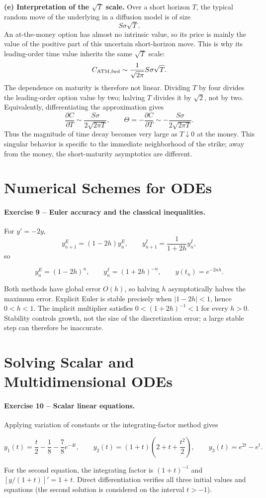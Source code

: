 \documentclass[10pt]{article}
\newcommand{\solution}[1]{\begin{tcolorbox}[breakable,colback=ResultBlue!3,colframe=ResultBlue,
  boxrule=0.8pt,arc=1mm,title=\textbf{Result},fonttitle=\bfseries]#1\end{tcolorbox}}
\begin{document}
\textbf{(e) Interpretation of the $\sqrt T$ scale.} Over a short horizon $T$,
the typical random move of the underlying in a diffusion model is of size
\[
S\sigma\sqrt T.
\]
An at-the-money option has almost no intrinsic value, so its price is mainly
the value of the positive part of this uncertain short-horizon move. This is
why its leading-order time value inherits the same $\sqrt T$ scale:
\[
C_{\rm ATM,fwd}\sim
\frac{1}{\sqrt{2\pi}}S\sigma\sqrt T.
\]
The dependence on maturity is therefore not linear. Dividing $T$ by four
divides the leading-order option value by two; halving $T$ divides it by
$\sqrt2$, not by two. Equivalently, differentiating the approximation gives
\[
\frac{\partial C}{\partial T}
\sim\frac{S\sigma}{2\sqrt{2\pi T}},
\qquad
\Theta=-\frac{\partial C}{\partial T}
\sim-\frac{S\sigma}{2\sqrt{2\pi T}}.
\]
Thus the magnitude of time decay becomes very large as $T\downarrow0$ at the
money. This singular behavior is specific to the immediate neighborhood of
the strike; away from the money, the short-maturity asymptotics are different.

\section{Numerical Schemes for ODEs}

\paragraph{Exercise 9 -- Euler accuracy and the classical inequalities.}
For $y'=-2y$,
\[
y_{n+1}^{E}=(1-2h)y_n^E,\qquad
y_{n+1}^{I}=\frac{1}{1+2h}y_n^I,
\]
so
\solution{\[
y_n^E=(1-2h)^n,\qquad y_n^I=(1+2h)^{-n},\qquad y(t_n)=e^{-2nh}.
\]}
Both methods have global error $O(h)$, so halving $h$ asymptotically halves
the maximum error. Explicit Euler is stable precisely when
$|1-2h|<1$, hence $0<h<1$. The implicit multiplier satisfies
$0<(1+2h)^{-1}<1$ for every $h>0$. Stability controls growth, not the size of
the discretization error; a large stable step can therefore be inaccurate.

\section{Solving Scalar and Multidimensional ODEs}

\paragraph{Exercise 10 -- Scalar linear equations.}
Applying variation of constants or the integrating-factor method gives
\solution{\[
y_1(t)=\frac{t}{2}-\frac18-\frac78e^{-4t},
\qquad
y_2(t)=(1+t)\left(2+t+\frac{t^2}{2}\right),
\qquad
y_3(t)=e^{2t}-e^t.
\]}
For the second equation, the integrating factor is $(1+t)^{-1}$ and
$[y/(1+t)]'=1+t$. Direct differentiation verifies all three initial values
and equations (the second solution is considered on the interval $t>-1$).
\end{document}
